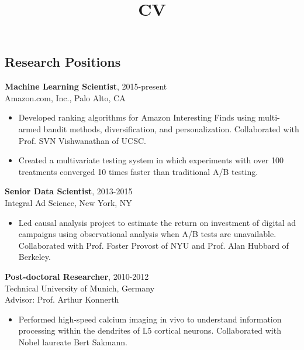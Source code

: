 \documentclass[line,11pt]{res}
\title{CV}
\begin{document}
 
\thispagestyle{empty} %
\address{246 $2^{nd}$ St. \#1401, San Francisco, CA 94105}
\address{716.771.8224}
\address{daniel.n.hill@gmail.com}
\address{www.danielnhill.com}

\begin{resume}

\section{Research Positions}
\vspace{0.1in} 

 {\bf Machine Learning Scientist}, 2015-present \\ Amazon.com, Inc., Palo Alto, CA 
  \begin{itemize}
          \item[] Developed ranking algorithms for Amazon Interesting Finds using multi-armed bandit methods, diversification, and personalization.  Collaborated with Prof. SVN Vishwanathan of UCSC.  
         \item[] Created a multivariate testing system in which experiments with over 100 treatments converged 10 times faster than traditional A/B testing.  
   \end{itemize}
   
 {\bf Senior Data Scientist}, 2013-2015 \\ Integral Ad Science, New York, NY 
  \begin{itemize}
          \item[] Led causal analysis project to estimate the return on investment of digital ad campaigns using observational analysis when A/B tests are unavailable.  Collaborated with Prof. Foster Provost of NYU and Prof. Alan Hubbard of Berkeley.  
   \end{itemize}
   
 {\bf Post-doctoral Researcher}, 2010-2012 \\ Technical University of Munich, Germany 
 \\ Advisor: Prof. Arthur Konnerth
  \begin{itemize}
        \item[] Performed high-speed calcium imaging in vivo to understand information processing within the dendrites of L5 cortical neurons.  Collaborated with Nobel laureate Bert Sakmann.
  \end{itemize}
    

\end{resume}
\end{document}
